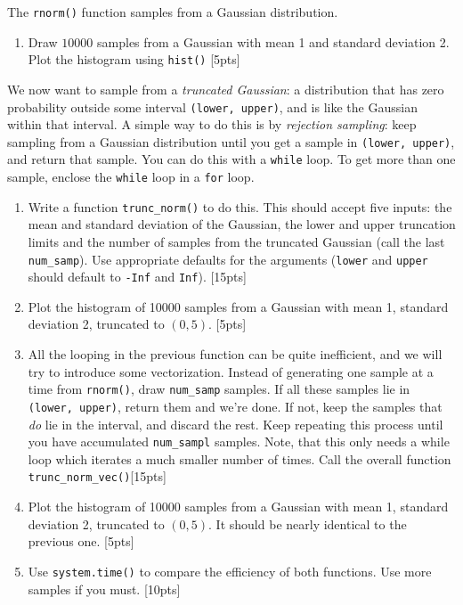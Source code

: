 \documentclass[10pt]{article}
\begin{document}
The {\tt rnorm()} function samples from a Gaussian distribution.
\begin{enumerate}
  \item Draw $10000$ samples from a Gaussian with mean 1 and standard deviation 2. Plot the histogram using {\tt hist()} \hfill [5pts]
\end{enumerate}
  {We now want to sample from a \emph{truncated Gaussian}: a distribution that has zero probability outside some interval
  {\tt (lower, upper)}, and is like the Gaussian within that interval. A simple way to do this is by \emph{rejection sampling}:
    keep sampling from a Gaussian distribution until you get a sample in {\tt (lower, upper)}, and return that sample.
    You can do this with a {\tt while} loop. To get more than one sample, enclose the {\tt while} loop in a {\tt for} loop.}
\begin{enumerate}[resume]
  \item Write a function {\tt trunc\_norm()} to do this. This should accept five inputs: the mean and standard deviation of
    the Gaussian, the lower and upper truncation limits and the number of samples from the truncated Gaussian (call the last {\tt num\_samp}).
    Use appropriate defaults for
    the arguments ({\tt lower} and {\tt upper} should default to {\tt -Inf} and {\tt Inf}). \hfill [15pts]
  \item Plot the histogram of
    10000 samples from a Gaussian with mean 1, standard deviation 2, truncated to $(0,5)$. \hfill [5pts]
  \item All the looping in the previous function can be quite inefficient, and we will try to introduce some vectorization.
    Instead of generating one sample at a time from {\tt rnorm()}, draw {\tt num\_samp} samples.
    If all these samples lie in {\tt (lower, upper)}, return them and we're done. If not, keep the samples that \emph{do} lie
    in the interval, and discard the rest. Keep repeating this process until you have accumulated {\tt num\_sampl} samples.
    Note, that this only needs a while loop which iterates a much smaller number of times. Call the overall function
    {\tt trunc\_norm\_vec()}\hfill [15pts]
  \item Plot the histogram of
    10000 samples from a Gaussian with mean 1, standard deviation 2, truncated to $(0,5)$. It should be nearly identical
    to the previous one. \hfill [5pts]
  \item Use {\tt system.time()} to compare the efficiency of both functions. Use more samples if you must. \hfill[10pts]
\end{enumerate}
\end{document}
